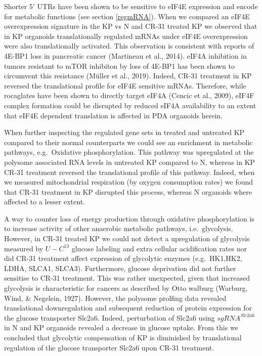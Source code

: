 \documentclass[
  12pt,
  openany]{book}
\begin{document}
Shorter 5' UTRs have been shown to be sensitive to eIF4E expression and encode for metabolic functions (see section \ref{regmRNA}). When we compared an eIF4E overexpression signature in the KP vs N and CR-31 treated KP we observed that in KP organoids translationally regulated mRNAs under eIF4E overexpression were also translationally activated. This observation is consistent with reports of 4E-BP1 loss in pancreatic cancer (Martineau et al., 2014). eIF4A inhibition in tumors resistant to mTOR inhibiton by loss of 4E-BP1 has been shown to circumvent this resistance (Müller et al., 2019). Indeed, CR-31 treatment in KP reversed the translational profile for eIF4E sensitive mRNAs. Therefore, while rocaglates have been shown to directly target eIF4A (Cencic et al., 2009), eIF4F complex formation could be disrupted by reduced eIF4A availability to an extent that eIF4E dependent translation is affected in PDA organoids herein.

When further inspecting the regulated gene sets in treated and untreated KP compared to their normal counterparts we could see an enrichment in metabolic pathways, e.g.~Oxidative phosphorylation. This pathway was upregulated at the polysome associated RNA levels in untreated KP compared to N, whereas in KP CR-31 treatment reversed the translational profile of this pathway. Indeed, when we measured mitochondrial respiration (by oxygen consumption rates) we found that CR-31 treatment in KP disrupted this process, whereas N organoids where affected to a lesser extent.

A way to counter loss of energy production through oxidative phosphorylation is to increase activity of other anaerobic metabolic pathways, i.e.~glycolysis. However, in CR-31 treated KP we could not detect a upregulation of glycolysis measured by \(U-C^{13}\) glucose labeling and extra cellular acidification rates nor did CR-31 treatment affect expression of glycolytic enzymes (e.g.~HK1,HK2, LDHA, SLCA1, SLCA3). Furthermore, glucose deprivation did not further sensitise to CR-31 treatment. This was rather unexpected, given that increased glycolysis is characteristic for cancers as described by Otto walburg (Warburg, Wind, \& Negelein, 1927). However, the polysome prolfing data revealed translational downregulation and subsequent reduction of protein expression for the glucose transporter Slc2a6. Indeed, perturbation of Slc2a6 using \(sgRNA^{Slc2a6}\) in N and KP organoids revealed a decrease in glucose uptake. From this we concluded that glycolytic compensation of KP is diminished by translational regulation of the glucose transporter Slc2a6 upon CR-31 treatment.
\end{document}
